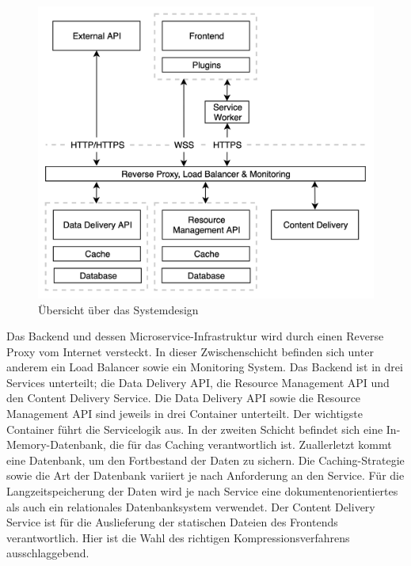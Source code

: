 \begin{figure}
    \begin{center}
    \includegraphics[scale=0.2]{img/abbildungen/MicroserviceInfrastruktur}
    \end{center}
    \caption{Übersicht über das Systemdesign}
    \label{figure:uebersichtueberdassystemdesign}
\end{figure}

Das Backend und dessen Microservice-Infrastruktur wird durch einen Reverse Proxy vom Internet versteckt.
In dieser Zwischenschicht befinden sich unter anderem ein Load Balancer sowie ein Monitoring System.
Das Backend ist in drei Services unterteilt; die Data Delivery API, die Resource Management API
und den Content Delivery Service. Die Data Delivery API sowie die Resource Management API sind jeweils
in drei Container unterteilt. Der wichtigste Container führt die Servicelogik aus. In der zweiten
Schicht befindet sich eine In-Memory-Datenbank, die für das Caching verantwortlich ist. Zuallerletzt
kommt eine Datenbank, um den Fortbestand der Daten zu sichern. Die Caching-Strategie sowie die Art der
Datenbank variiert je nach Anforderung an den Service. Für die Langzeitspeicherung der Daten wird je nach Service
eine dokumentenorientiertes als auch ein relationales Datenbanksystem verwendet. Der Content Delivery Service
ist für die Auslieferung der statischen Dateien des Frontends verantwortlich. Hier ist die Wahl des
richtigen Kompressionsverfahrens ausschlaggebend.

